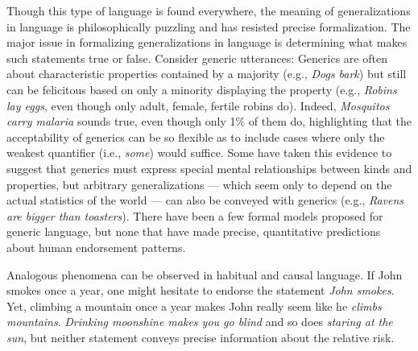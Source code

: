 \documentclass[11pt,letterpaper]{letter} %
\begin{document}
\begin{letter}
Though this type of language is found everywhere, the meaning of generalizations in language is philosophically puzzling and has resisted precise formalization. 
The major issue in formalizing generalizations in language is determining what makes such statements true or false.
Consider generic utterances:
Generics are often about characteristic properties contained by a majority (e.g., \emph{Dogs bark}) but still can be felicitous based on only a minority displaying the property (e.g., \emph{Robins lay eggs}, even though only adult, female, fertile robins do). 
Indeed, \emph{Mosquitos carry malaria} sounds true, even though only 1\% of them do, highlighting that the acceptability of generics can be so flexible as to include cases where only the weakest quantifier (i.e., \emph{some}) would suffice. 
Some have taken this evidence to suggest that generics must express special mental relationships between kinds and properties, but arbitrary generalizations --- which seem only to depend on the actual statistics of the world --- can also be conveyed with generics (e.g., \emph{Ravens are bigger than toasters}).
There have been a few formal models proposed for generic language, but none that have made precise, quantitative predictions about human endorsement patterns.

Analogous phenomena can be observed in habitual and causal language.
If John smokes once a year, one might hesitate to endorse the statement \emph{John smokes}.
Yet, climbing a mountain once a year makes John really seem like he \emph{climbs mountains}.
\emph{Drinking moonshine makes you go blind} and so does \emph{staring at the sun}, but neither statement conveys precise information about the relative risk.


\end{letter}
\end{document}
